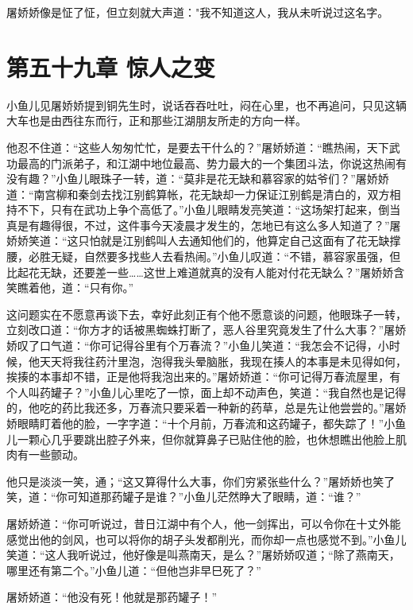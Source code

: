 \documentclass[12pt,oneside]{book}
\begin{document}
屠娇娇像是怔了怔，但立刻就大声道："我不知道这人，我从未听说过这名字。

\hypertarget{ux7b2cux4e94ux5341ux4e5dux7ae0-ux60caux4ebaux4e4bux53d8}{%
\chapter{第五十九章
惊人之变}\label{ux7b2cux4e94ux5341ux4e5dux7ae0-ux60caux4ebaux4e4bux53d8}}

小鱼儿见屠娇娇提到铜先生时，说话吞吞吐吐，闷在心里，也不再追问，只见这辆大车也是由西往东而行，正和那些江湖朋友所走的方向一样。

他忍不住道：``这些人匆匆忙忙，是要去干什么的？''屠娇娇道：``瞧热闹，天下武功最高的门派弟子，和江湖中地位最高、势力最大的一个集团斗法，你说这热闹有没有趣？''小鱼儿眼珠子一转，道：``莫非是花无缺和慕容家的姑爷们？''屠娇娇道：``南宫柳和秦剑去找江别鹤算帐，花无缺却一力保证江别鹤是清白的，双方相持不下，只有在武功上争个高低了。''小鱼儿眼睛发亮笑道：``这场架打起来，倒当真是有趣得很，不过，这件事今天凌晨才发生的，怎地已有这么多人知道了？''屠娇娇笑道：``这只怕就是江别鹤叫人去通知他们的，他算定自己这面有了花无缺撑腰，必胜无疑，自然要多找些人去看热闹。''小鱼儿叹道：``不错，慕容家虽强，但比起花无缺，还要差一些\ldots\ldots 这世上难道就真的没有人能对付花无缺么？''屠娇娇含笑瞧着他，道：``只有你。''

这问题实在不愿意再谈下去，幸好此刻正有个他不愿意谈的问题，他眼珠子一转，立刻改口道：``你方才的话被黑蜘蛛打断了，恶人谷里究竟发生了什么大事？''屠娇娇叹了口气道：``你可记得谷里有个万春流？''小鱼儿笑道：``我怎会不记得，小时候，他天天将我往药汁里泡，泡得我头晕脑胀，我现在揍人的本事是未见得如何，挨揍的本事却不错，正是他将我泡出来的。''屠娇娇道：``你可记得万春流屋里，有个人叫药罐子？''小鱼儿心里吃了一惊，面上却不动声色，笑道：``我自然也是记得的，他吃的药比我还多，万春流只要采着一种新的药草，总是先让他尝尝的。''屠娇娇眼睛盯着他的脸，一字字道：``十个月前，万春流和这药罐子，都失踪了！''小鱼儿一颗心几乎要跳出腔子外来，但你就算鼻子已贴住他的脸，也休想瞧出他脸上肌肉有一些颤动。

他只是淡淡一笑，通；``这又算得什么大事，你们穷紧张些什么？''屠娇娇也笑了笑，道：``你可知道那药罐子是谁？''小鱼儿茫然睁大了眼睛，道：``谁？''

屠娇娇道：``你可听说过，昔日江湖中有个人，他一剑挥出，可以令你在十丈外能感觉出他的剑风，也可以将你的胡子头发都削光，而你却一点也感觉不到。''小鱼儿笑道：``这人我听说过，他好像是叫燕南天，是么？''屠娇娇叹道；``除了燕南天，哪里还有第二个。''小鱼儿道：``但他岂非早巳死了？''

屠娇娇道：``他没有死！他就是那药罐子！''
\end{document}
